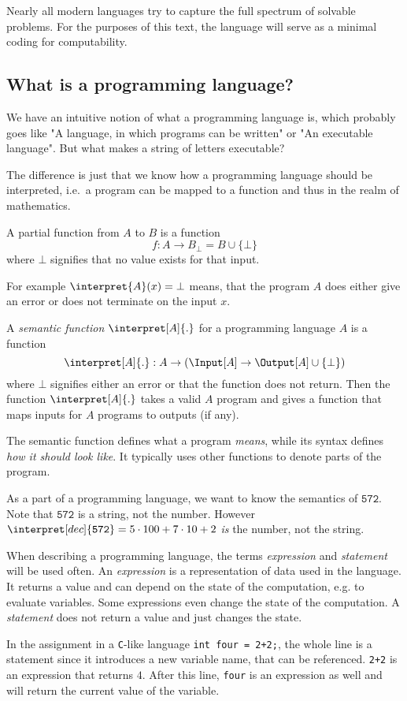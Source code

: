 Nearly all modern languages try to capture the full spectrum of solvable 
problems. For the purposes of this text, the \WHILE language will 
serve as a minimal coding for computability.

\subsection{What is a programming language?} %
\label{sub:What is a programming language}
We have an intuitive notion of what a programming language is, which probably
goes like "A language, in which programs can be written" or "An executable
language". But what makes a string of letters executable? 

The difference is just that we know how a programming language should be 
interpreted, i.e.\ a program can be mapped to a function and thus in the 
realm of mathematics.

\begin{defn}
	A partial function from $A$ to $B$ is a function 
	\[ f:A\rightarrow B_\bot = B\cup \{\bot\}\]
	where $\bot$ signifies that no value exists for that input.

	For example $\interpret{A}(x) = \bot$ means, that the program $A$ does 
	either give an error or does not terminate on the input $x$.
\end{defn}

\begin{defn}
	A {\em semantic function} $\interpret[A]{.}$ for a programming language $A$ is a function
	\[ \interpret[A]{.}: A \rightarrow \left( \Input[A] \rightarrow 
	\Output[A]\cup \{\bot\}\right)\]
	where $\bot$ signifies either an error or that the function does not return.
	Then the function $\interpret[A]{.}$ takes a valid $A$ program and 
	gives a function that maps inputs for $A$ programs to outputs (if any).
\end{defn}
The semantic function defines what a program {\em means}, while its syntax 
defines {\em how it should look like}. It typically uses other functions to 
denote parts of the program. 
\begin{example}
	As a part of a programming language, we want to know the semantics of 
	$\mathtt{572}$. Note that $\mathtt{572}$ is a string, not the number. However 
	$\interpret[dec]{\mathtt{572}}=5\cdot 100+7\cdot 10+ 2$ {\em is} the number, not the string. 
\end{example}

When describing a programming language, the terms {\em expression} and {\em
statement} will be used often. An {\em expression} is a representation of 
data used in the language. It returns a value and can depend on the state of 
the computation, e.g. to evaluate variables. Some expressions even change the 
state of the computation. A {\em statement} does not return a value and just 
changes the state.
\begin{example}
	In the assignment in a {\tt C}-like language {\tt int four = 2+2;}, the 
	whole line is a statement since it introduces a new variable name, that 
	can be referenced. {\tt 2+2} is an expression that returns $4$. After this 
	line, {\tt four} is an expression as well and will return the current value 
	of the variable.
\end{example}

